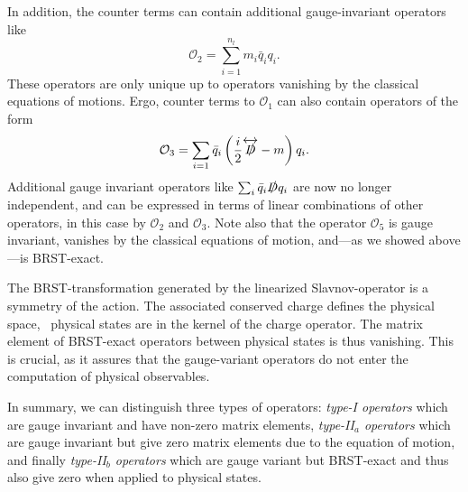 In addition, the counter terms can contain additional gauge-invariant operators like
\begin{equation}
\mathcal{O}_{2} = \sum_{i = 1}^{n_l} m_i \bar{q}_i q_i.
\end{equation}
These operators are only unique up to operators vanishing by the classical equations of motions. Ergo, counter terms to $\mathcal{O}_1$ can also contain operators of the form
\begin{equation}
\mathcal{O}_3 = \sum_{i = 1} \bar{q}_i \left(\frac{i}{2} \overleftrightarrow{\slashed{D}} - m \right) q_i.
\end{equation}
Additional gauge invariant operators like $\sum_i \bar{q}_i \slashed{D} q_i$ are now no longer independent, and can be expressed in terms of linear combinations of other operators, in this case by $\mathcal{O}_2$ and $\mathcal{O}_3$. Note also that the operator $\mathcal{O}_5$ is gauge invariant, vanishes by the classical equations of motion, and---as we showed above---is BRST-exact.

The BRST-transformation generated by the linearized Slavnov-operator is a symmetry of the action. The associated conserved charge defines the physical space, \ie\ physical states are in the kernel of the charge operator. The matrix element of BRST-exact operators between physical states is thus vanishing. This is crucial, as it assures that the gauge-variant operators do not enter the computation of physical observables.

In summary, we can distinguish three types of operators: \textit{type-I operators} which are gauge invariant and have non-zero matrix elements, \textit{type-II${}_a$ operators} which are gauge invariant but give zero matrix elements due to the equation of motion, and finally \textit{type-II${}_b$ operators} which are gauge variant but BRST-exact and thus also give zero when applied to physical states.

